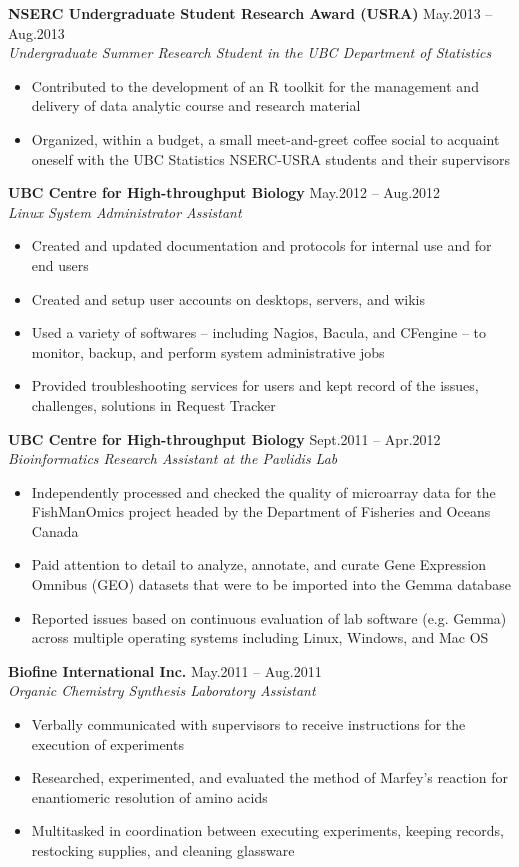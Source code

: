 \documentclass{res}
\newcommand{\linehead}[2]{%
  {\bf #1} \hfill #2\\}
\newcommand{\linetitle}[1]{%
  {\sl #1}}
\begin{document}
\begin{resume}
\linehead{NSERC Undergraduate Student Research Award (USRA)}{May.2013 -- Aug.2013}
\linetitle{Undergraduate Summer Research Student in the UBC Department of Statistics}
\begin{itemize}
  \item Contributed to the development of an R toolkit for the management and delivery of data analytic course and research material
  \item Organized, within a budget, a small meet-and-greet coffee social to acquaint oneself with the UBC Statistics NSERC-USRA students and their supervisors
\end{itemize}

\linehead{UBC Centre for High-throughput Biology}{May.2012 -- Aug.2012}
\linetitle{Linux System Administrator Assistant}
\begin{itemize}
  \item Created and updated documentation and protocols for internal use and for end users
  \item Created and setup user accounts on desktops, servers, and wikis
  \item Used a variety of softwares -- including Nagios, Bacula, and CFengine -- to monitor, backup, and perform system administrative jobs
  \item Provided troubleshooting services for users and kept record of the issues, challenges, solutions in Request Tracker
\end{itemize}

\linehead{UBC Centre for High-throughput Biology}{Sept.2011 -- Apr.2012}
\linetitle{Bioinformatics Research Assistant at the Pavlidis Lab}
\begin{itemize}
  \item Independently processed and checked the quality of microarray data for the FishManOmics project headed by the Department of Fisheries and Oceans Canada
  \item Paid attention to detail to analyze, annotate, and curate Gene Expression Omnibus (GEO) datasets that were to be imported into the Gemma database
  \item Reported issues based on continuous evaluation of lab software (e.g. Gemma) across multiple operating systems including Linux, Windows, and Mac OS
\end{itemize}

\pagebreak
\linehead{Biofine International Inc.}{May.2011 -- Aug.2011}
\linetitle{Organic Chemistry Synthesis Laboratory Assistant}
\begin{itemize}
  \item Verbally communicated with supervisors to receive instructions for the execution of experiments
  \item Researched, experimented, and evaluated the method of Marfey's reaction for enantiomeric resolution of amino acids
  \item Multitasked in coordination between executing experiments, keeping records, restocking supplies, and cleaning glassware
\end{itemize}


\end{resume}
\end{document}
